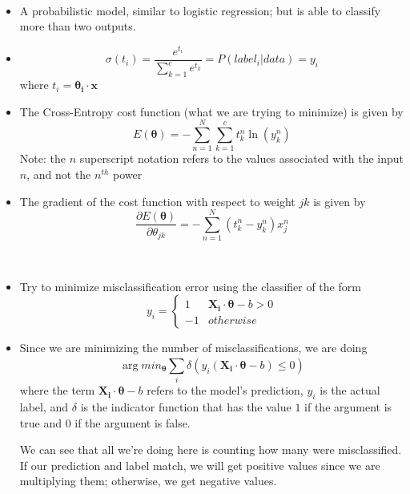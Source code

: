 \documentclass[12pt]{article}
\newenvironment{concept}[1]{\begin{trivlist}
		\item[\hskip \labelsep {\bfseries #1}]}{\end{trivlist}}
\begin{document}
\begin{concept}{Softmax Regression}
	\
	\begin{itemize}
		\item {
			A probabilistic model, similar to logistic regression; but is able to classify more than two outputs.
		}
		\item {
			$$\sigma(t_i) = \frac{e^{t_i}}{\sum_{k=1}^{c} e^{t_k}} = P(label_i | data) = y_i$$
			where $t_i = \boldsymbol{\theta_i} \cdot \boldsymbol{x}$
		}
		\item {
			The Cross-Entropy cost function (what we are trying to minimize) is given by
			$$E(\boldsymbol{\theta}) = - \sum_{n=1}^{N} \sum_{k=1}^{c} t_k^n \ln(y_k^n)$$
			Note: the $n$ superscript notation refers to the values associated with the input $n$, and not the $n^{th}$ power
		}
		\item {
			The gradient of the cost function with respect to weight $jk$ is given by
			$$\frac{\partial E(\boldsymbol{\theta})}{\partial \theta_{jk}} = - \sum_{n=1}^{N} (t_k^n - y_k^n) x_j^n$$
		}
	\end{itemize}
\end{concept}

\begin{concept}{Support Vector Machine}
	\
	\begin{itemize}
		\item {
			Try to minimize misclassification error using the classifier of the form
			\[
				y_i =
				\begin{cases}
					1 & \boldsymbol{X_i} \cdot \boldsymbol{\theta} - b > 0 \\
					-1 & otherwise
				\end{cases}
			\]
		}
		\item {
			Since we are minimizing the number of misclassifications, we are doing
			$$\arg min_{\boldsymbol{\theta}} \sum_{i}^{} \delta (y_i (\boldsymbol{X_i} \cdot \boldsymbol{\theta} - b) \leq 0)$$
			where the term $\boldsymbol{X_i} \cdot \boldsymbol{\theta} - b$ refers to the model's prediction, $y_i$ is the actual
			label, and $\delta$ is the indicator function that has the value $1$ if the argument is true and $0$ if the argument is false.
			
			We can see that all we're doing here is counting how many were misclassified. If our prediction and label match, we will get
			positive values since we are multiplying them; otherwise, we get negative values.
		}
	\end{itemize}
\end{concept}
\end{document}
